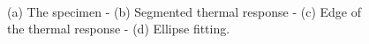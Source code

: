 \graphicspath{ {./Figure/Figure11/}}
\begin{figure}
  \centering
	

  \hspace*{\fill}
  \hspace*{\fill} \\ \hspace*{\fill}
   \hfill
   \hfill
  \hspace*{\fill}
	  
		\caption{(a) The specimen - (b) Segmented thermal response - (c) Edge of the thermal
		response - (d) Ellipse fitting.}
		\label{fig:9}
		\end{figure}

